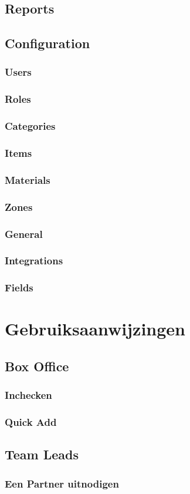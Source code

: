 \documentclass[]{memoir}
\begin{document}
\section{Reports}

\section{Configuration}
\subsection{Users}
\subsection{Roles}
\subsection{Categories}
\subsection{Items}
\subsection{Materials}
\subsection{Zones}
\subsection{General}
\subsection{Integrations}
\subsection{Fields}

\chapter{Gebruiksaanwijzingen}

\section{Box Office}
\subsection{Inchecken}
\subsection{Quick Add}

\section{Team Leads}
\subsection{Een Partner uitnodigen}
\end{document}
